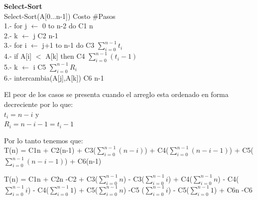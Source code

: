 \documentclass[spanish]{article}
\begin{document}
{	{\Large{\bf Select-Sort}}\\
	Select-Sort(A[0...n-1]) \hspace{2.9cm}Costo \hspace{1.7cm} \#Pasos \\
	1.-	\hspace{0.7cm}for j $\leftarrow$ 0 to n-2 do \hspace{2.3cm} C1 \hspace{2.0cm} n\\
	2.-		\hspace{1.4cm}k $\leftarrow$ j\hspace{4.1cm}   C2 \hspace{2.0cm} n-1\\
	3.-		\hspace{1.4cm}for i $\leftarrow$ j+1 to n-1 do \hspace{1.1cm} C3 \hspace{2.0cm}$\sum_{i=0}^{n-1}t_{i}$\\
	4.-			\hspace{2.1cm}if A[i] $<$ A[k] then \hspace{1cm} C4 \hspace{2.0cm}$\sum_{i=0}^{n-1}(t_{i}-1)$\\
	5.-				\hspace{2.8cm}k $\leftarrow$ i \hspace{2.5cm} C5 \hspace{2.0cm}$\sum_{i=0}^{n-1}R_{i}$\\
	6.-	\hspace{1.4cm} intercambia(A[j],A[k]) \hspace{1.2cm} C6 \hspace{2.0cm}n-1\\
	\bigskip
	
	\bigskip
	
	El peor de los casos se presenta cuando el arreglo esta ordenado en forma decreciente por lo  que:\\ 
	$t_{i} = n-i$ y\\
	$R_{i} = n-i-1 = t_{i}-1$\\
	\bigskip
	
	Por lo tanto tenemos que:\\
	T(n) = C1n + C2(n-1) + C3($\sum_{i=0}^{n-1}(n-i)$) + C4($\sum_{i=0}^{n-1}(n-i-1)$) + C5($\sum_{i=0}^{n-1}(n-i-1)$) + C6(n-1)
	\bigskip
	
	T(n) = C1n + C2n -C2 + C3($\sum_{i=0}^{n-1}n$) - C3($\sum_{i=0}^{n-1}i$) + C4($\sum_{i=0}^{n-1}n$) - C4($\sum_{i=0}^{n-1}i$) - C4($\sum_{i=0}^{n-1}1$) + C5($\sum_{i=0}^{n-1}n$) -C5 ($\sum_{i=0}^{n-1}i$) - C5($\sum_{i=0}^{n-1}1$) + C6n -C6
	\bigskip
	
}
\end{document}
